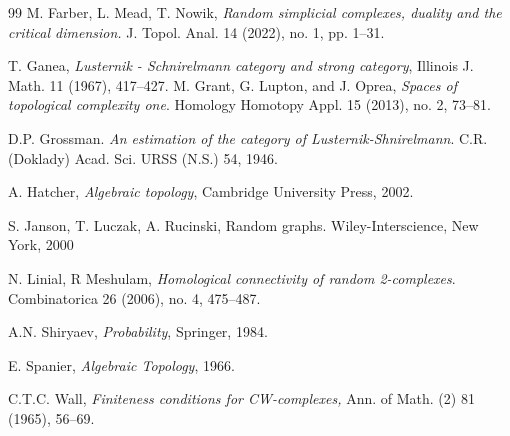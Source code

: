 \documentclass[11pt,twoside, reqno]{amsart}
\theoremstyle{plain}
\theoremstyle{definition}
\begin{document}
\begin{thebibliography}{99}
 M. Farber, L. Mead, T. Nowik, \textit{Random simplicial complexes, duality and the critical dimension.} J. Topol. Anal. 14 (2022), no. 1, pp. 1–31.


 T. Ganea, \textit{Lusternik - Schnirelmann category and strong category}, Illinois J. Math. 11 (1967), 417–427.
 M. Grant, G. Lupton, and J. Oprea, \textit{Spaces of topological complexity one}. Homology Homotopy Appl. 15 (2013), no. 2, 73–81.

 D.P. Grossman. \textit{An estimation of the category of Lusternik-Shnirelmann}. C.R. (Doklady) Acad. Sci. URSS (N.S.) 54, 1946.

 A. Hatcher, \textit{Algebraic topology}, Cambridge University Press, 2002.

 S. Janson, T. Luczak, A. Rucinski,  
Random graphs. Wiley-Interscience, New York, 2000

 N. Linial, R Meshulam, \textit{Homological connectivity of random 2-complexes}. Combinatorica 26 (2006), no. 4, 475–487. 

 A.N. Shiryaev, \textit{Probability}, Springer, 1984.

 E. Spanier, \textit{Algebraic Topology}, 1966. 

 C.T.C. Wall, 
\textit{Finiteness conditions for CW-complexes,} Ann. of Math. (2) 81 (1965), 56–69.



\end{thebibliography}
\end{document}
